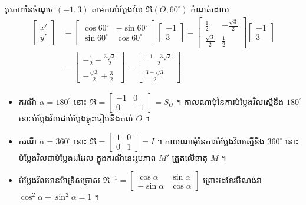 \begin{example}[ឧទាហរណ៍]
រូបភាពនៃចំណុច $(-1, 3)$ តាមការបំប្លែងវិល $\mathfrak{R}(O, 60^\circ)$ កំណត់ដោយ
\[ \begin{aligned} \begin{bmatrix} x'\\ y' \end{bmatrix} &= \begin{bmatrix} \cos 60^\circ & -\sin 60^\circ\\ \sin 60^\circ & \cos 60^\circ \end{bmatrix}\begin{bmatrix} -1\\ 3 \end{bmatrix} = \begin{bmatrix} \frac{1}{2} & -\frac{\sqrt{3}}{2}\\[3pt] \frac{\sqrt{3}}{2} & \frac{1}{2} \end{bmatrix}\begin{bmatrix} -1\\ 3 \end{bmatrix}\\ &= \begin{bmatrix} -\frac{1}{2} - \frac{3\sqrt{3}}{2}\\[3pt] -\frac{\sqrt{3}}{2} + \frac{3}{2} \end{bmatrix} = \begin{bmatrix} \frac{-1 - 3\sqrt{3}}{2}\\[3pt] \frac{3 - \sqrt{3}}{2} \end{bmatrix} \end{aligned} \]
\end{example}

\begin{itemize}
  \item ករណី $\alpha = 180^\circ$ នោះ $\mathfrak{R} = \begin{bmatrix} -1 & 0\\ 0 & -1 \end{bmatrix} = S_O$ ។ កាលណាមុំនៃការបំប្លែងវិលស្មើនឹង $180^\circ$ នោះបំប្លែងវិលជាបំប្លែងឆ្លុះធៀបនឹងគល់ $O$ ។
  \item ករណី $\alpha = 360^\circ$ នោះ $\mathfrak{R} = \begin{bmatrix} 1 & 0\\ 0 & 1 \end{bmatrix} = I$ ។ កាលណាមុំនៃការបំប្លែងវិលស្មើនឹង $360^\circ$ នោះបំប្លែងវិលជាបំប្លែងដដែល ក្នុងករណីនេះរូបភាព $M'$ ត្រួតលើធាតុ $M$ ។
  \item បំប្លែងវិលមានម៉ាទ្រីសច្រាស $\mathfrak{R}^{-1} = \begin{bmatrix} \cos\alpha & \sin\alpha\\ -\sin\alpha & \cos\alpha \end{bmatrix}$ ព្រោះដេទែរមីណង់វា $\cos^2\alpha + \sin^2\alpha = 1$ ។
\end{itemize}

